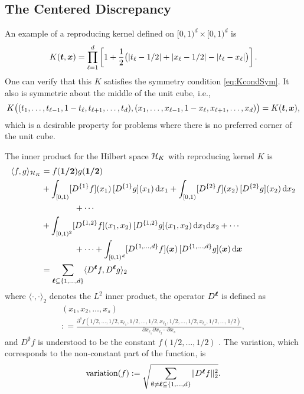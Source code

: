 \documentclass{svproc}
\begin{document}
\subsection{The Centered Discrepancy}
An example of a reproducing kernel defined on $[0,1)^d \times [0,1)^d$ is
\begin{equation} \label{eq:ctrkernel}
	K({\boldsymbol{t}},{\boldsymbol{x}}) = \prod_{\ell = 1}^d \left[ 1 + \frac 12 \bigl ( \lvert t_\ell - 1/2 \rvert + \lvert x_\ell - 1/2 \rvert - \lvert t_\ell - x_\ell \rvert \bigr ) \right] .
\end{equation}
One can verify that this $K$ satisfies the symmetry condition \eqref{eq:KcondSym}.  It also is symmetric about the middle of the unit cube, i.e.,
\begin{equation*}
	K\bigl((t_1,\ldots, t_{\ell-1}, 1 - t_\ell,  t_{\ell+1}, \ldots, t_d),
	(x_1,\ldots, x_{\ell-1}, 1 - x_\ell,  x_{\ell+1}, \ldots, x_d)
	\bigr) =
	K({\boldsymbol{t}},{\boldsymbol{x}}),
\end{equation*}
which is a desirable property for problems where there is no preferred corner of the unit cube.

The inner product for the Hilbert space ${\mathcal{H}}_K$ with reproducing kernel $K$ is
\begin{align}
	\langle f, g \rangle_{{\mathcal{H}}_K} &= f(\boldsymbol{1/2}) g(\boldsymbol{1/2}) \nonumber
	\\
	&
	+ \int_{[0,1)} [D^{\{1\}}f](x_1) \, [D^{\{1\}}g](x_1)\, \mathrm{d} x_1
	+ \int_{[0,1)} [D^{\{2\}}f](x_2) \, [D^{\{2\}}g](x_2)\, \mathrm{d} x_2 \nonumber \\
	& \qquad \qquad + \cdots \nonumber\\
	&
	+ \int_{[0,1)^2} [D^{{\{1,2\}}}f](x_1,x_2) \, [D^{\{1,2\}}g](x_1,x_2)\, \mathrm{d} x_1 \mathrm{d} x_2 + \cdots \nonumber \\
	&  \qquad \qquad + \cdots + \int_{[0,1)^d} [D^{\{1,\ldots, d\}}f]({\boldsymbol{x}}) \, [D^{\{1,\ldots, d\}}g]({\boldsymbol{x}}) \, \mathrm{d} {\boldsymbol{x}} \nonumber \\
	& = \sum_{{\boldsymbol{\ell}} \subseteq \{1, \ldots, d\}} \langle D^{{\boldsymbol{\ell}}}f, D^{{\boldsymbol{\ell}}}g \rangle_2
\end{align}
where $\langle \cdot,\cdot \rangle_2$ denotes the $L^2$ inner product, the operator $D^{{\boldsymbol{\ell}}}$ is defined as
\begin{multline*}
	[D^{\{\ell_1, \ell_2, \ldots, \ell_s\} }f](x_1, x_2, \ldots, x_s) \\
	: = \frac{\partial^s f(1/2,\ldots, 1/2, x_{\ell_1}, 1/2, \ldots, 1/2, x_{\ell_2}, 1/2, \ldots, 1/2, x_{\ell_s}, 1/2, \ldots, 1/2)}{\partial x_{\ell_1} \partial x_{\ell_2} \cdots \partial x_s},
\end{multline*}
and $D^{\emptyset}f$ is understood to be the constant $f(1/2, \ldots, 1/2)$ \cite{Hic97a}.  The variation, which corresponds to the non-constant part of the function, is
\begin{equation*}
		\text{variation}(f) := \sqrt{\sum_{\emptyset \ne {\boldsymbol{\ell}} \subseteq \{1, \ldots, d\}} \lVert D^{{\boldsymbol{\ell}}}f\rVert_2^2}.
\end{equation*}
\end{document}
